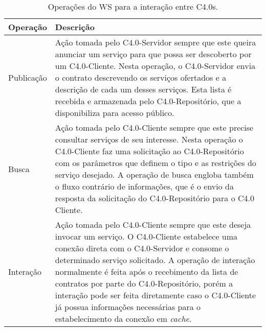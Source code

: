 \begin{table}[t]
	\centering
	\caption{Operações do WS para a interação entre C4.0s.}
	\label{tab:operacoes-ws}
	\begin{tabular}{p{3cm}p{12cm}}
		\hline
		\textbf{Operação}
		 & \textbf{Descrição}                                                                                                                                                                                                                                                                                                                                                                                                                                                \\

		\hline
		Publicação
		 & Ação tomada pelo C4.0-Servidor sempre que este queira anunciar um serviço para que possa ser descoberto por um C4.0-Cliente. Nesta operação, o C4.0-Servidor envia o contrato descrevendo os serviços ofertados e a descrição de cada um desses serviços. Esta lista é recebida e armazenada pelo C4.0-Repositório, que a disponibiliza para acesso público.                                                                                                      \\

		\hline
		Busca
		 & Ação tomada pelo C4.0-Cliente sempre que este precise consultar serviços de seu interesse. Nesta operação o C4.0-Cliente faz uma solicitação ao C4.0-Repositório com os parâmetros que definem o tipo e as restrições do serviço desejado. A operação de busca engloba também o fluxo contrário de informações, que é o envio da resposta da solicitação do C4.0-Repositório para o C4.0 Cliente.                                                                 \\

		\hline
		Interação
		 & Ação tomada pelo C4.0-Cliente sempre que este deseja invocar um serviço. O C4.0-Cliente estabelece uma conexão direta com o C4.0-Servidor e consome o determinado serviço solicitado. A operação de interação normalmente é feita após o recebimento da lista de contratos por parte do C4.0-Repositório, porém a interação pode ser feita diretamente caso o C4.0-Cliente já possua informações necessárias para o estabelecimento da conexão em \textit{cache}. \\

		\hline
	\end{tabular}
\end{table}

